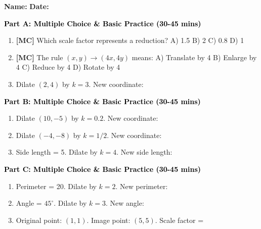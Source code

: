 \documentclass[12pt, letterpaper, fleqn]{article}
\newcommand{\blank}{\underline{\hspace{2.2cm}}}
\begin{document}
\textbf{Name:} \underline{\hspace{5cm}}
\hfill
\textbf{Date:} \underline{\hspace{3cm}}\\


\begin{tcolorbox}[colback=customteal!20]
\large\textcolor{black}{\textbf{Part A: Multiple Choice \& Basic Practice (30-45 mins)}}
\end{tcolorbox}

\vspace{3mm}

\begin{enumerate}[itemsep=2.5cm, leftmargin=0.6cm]
\item \textbf{[MC]} Which scale factor represents a reduction?
A) 1.5 B) 2 C) 0.8 D) 1
\item \textbf{[MC]} The rule $(x, y) \rightarrow (4x, 4y)$ means:
A) Translate by 4 B) Enlarge by 4 C) Reduce by 4 D) Rotate by 4
\item Dilate $(2, 4)$ by $k=3$. New coordinate: \blank
\end{enumerate}

\newpage

\begin{tcolorbox}[colback=customteal!20]
\large\textcolor{black}{\textbf{Part B: Multiple Choice \& Basic Practice (30-45 mins)}}
\end{tcolorbox}

\vspace{3mm}

\begin{enumerate}[itemsep=2.5cm, leftmargin=0.6cm, resume]
\item Dilate $(10, -5)$ by $k=0.2$. New coordinate: \blank
\item Dilate $(-4, -8)$ by $k=1/2$. New coordinate: \blank
\item Side length = 5. Dilate by $k=4$. New side length: \blank
\end{enumerate}

\newpage

\begin{tcolorbox}[colback=customteal!20]
\large\textcolor{black}{\textbf{Part C: Multiple Choice \& Basic Practice (30-45 mins)}}
\end{tcolorbox}

\vspace{3mm}

\begin{enumerate}[itemsep=2.5cm, leftmargin=0.6cm, resume]
\item Perimeter = 20. Dilate by $k=2$. New perimeter: \blank
\item Angle = $45^\circ$. Dilate by $k=3$. New angle: \blank
\item Original point: $(1, 1)$. Image point: $(5, 5)$. Scale factor = \blank
\end{enumerate}
\end{document}
